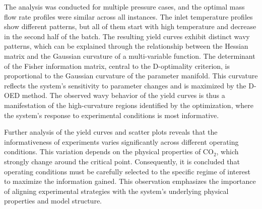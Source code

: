 \documentclass[a4paper,fleqn]{cas-dc}
\begin{document}
The analysis was conducted for multiple pressure cases, and the optimal mass flow rate profiles were similar across all instances. The inlet temperature profiles show different patterns, but all of them start with high temperature and decrease in the second half of the batch. The resulting yield curves exhibit distinct wavy patterns, which can be explained through the relationship between the Hessian matrix and the Gaussian curvature of a multi-variable function. The determinant of the Fisher information matrix, central to the D-optimality criterion, is proportional to the Gaussian curvature of the parameter manifold. This curvature reflects the system's sensitivity to parameter changes and is maximized by the D-OED method. The observed wavy behavior of the yield curves is thus a manifestation of the high-curvature regions identified by the optimization, where the system's response to experimental conditions is most informative.

Further analysis of the yield curves and scatter plots reveals that the informativeness of experiments varies significantly across different operating conditions. This variation depends on the physical properties of CO$_2$, which strongly change around the critical point. Consequently, it is concluded that operating conditions must be carefully selected to the specific regime of interest to maximize the information gained. This observation emphasizes the importance of aligning experimental strategies with the system's underlying physical properties and model structure.

%



%

\clearpage
\newpage
\end{document}
